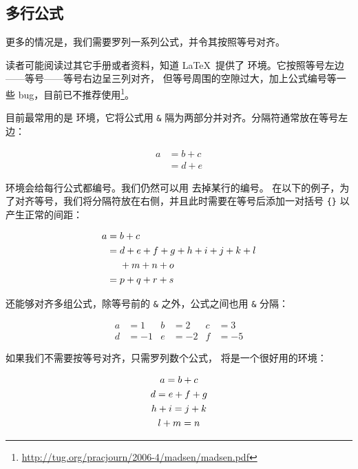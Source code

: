\subsection{多行公式}\label{subsec:align}

更多的情况是，我们需要罗列一系列公式，并令其按照等号对齐。

读者可能阅读过其它手册或者资料，知道 \LaTeX\ 提供了  环境。它按照等号左边——等号——等号右边呈三列对齐，
但等号周围的空隙过大，加上公式编号等一些 bug，目前已不推荐使用\footnote{\url{http://tug.org/pracjourn/2006-4/madsen/madsen.pdf}}。

目前最常用的是  环境，它将公式用 \texttt\& 隔为两部分并对齐。分隔符通常放在等号左边：
\begin{example}
\begin{align}
a & = b + c \\
& = d + e
\end{align}
\end{example}

 环境会给每行公式都编号。我们仍然可以用  去掉某行的编号。
在以下的例子，为了对齐等号，我们将分隔符放在右侧，并且此时需要在等号后添加一对括号 \texttt\{\texttt\} 以产生正常的间距：
\begin{example}
\begin{align}
a ={} & b + c \\
  ={} & d + e + f + g + h + i
        + j + k + l \notag \\
      & + m + n + o \\
  ={} & p + q + r + s
\end{align}
\end{example}

 还能够对齐多组公式，除等号前的 \texttt\& 之外，公式之间也用 \texttt\& 分隔：
\begin{example}
\begin{align}
a &=1  &  b &=2   & c &=3   \\
d &=-1 &  e &=-2  & f &=-5 
\end{align}
\end{example}

如果我们不需要按等号对齐，只需罗列数个公式， 将是一个很好用的环境：
\begin{example}
\begin{gather}
a = b + c \\
d = e + f + g \\
h + i = j + k \notag \\
l + m = n
\end{gather}
\end{example}

